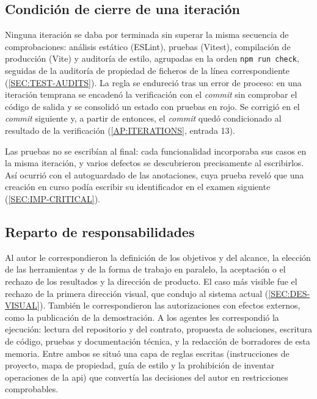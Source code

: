 \subsection{Condición de cierre de una iteración}

Ninguna iteración se daba por terminada sin superar la misma secuencia de comprobaciones:
análisis estático (ESLint), pruebas (Vitest), compilación de producción (Vite) y auditoría de
estilo, agrupadas en la orden \texttt{npm run check}, seguidas de la auditoría de propiedad de
ficheros de la línea correspondiente (\cref{SEC:TEST-AUDITS}). La regla se endureció tras un
error de proceso: en una iteración temprana se encadenó la verificación con el
\textit{commit} sin comprobar el código de salida y se consolidó un estado con pruebas en
rojo. Se corrigió en el \textit{commit} siguiente y, a partir de entonces, el \textit{commit}
quedó condicionado al resultado de la verificación (\cref{AP:ITERATIONS}, entrada 13).

Las pruebas no se escribían al final: cada funcionalidad incorporaba sus casos en la misma
iteración, y varios defectos se descubrieron precisamente al escribirlos. Así ocurrió con el
autoguardado de las anotaciones, cuya prueba reveló que una creación en curso podía escribir
su identificador en el examen siguiente (\cref{SEC:IMP-CRITICAL}).

\subsection{Reparto de responsabilidades}

Al autor le correspondieron la definición de los objetivos y del alcance, la elección de las
herramientas y de la forma de trabajo en paralelo, la aceptación o el rechazo de los
resultados y la dirección de producto. El caso más visible fue el rechazo de la primera
dirección visual, que condujo al sistema actual (\cref{SEC:DES-VISUAL}). También le
correspondieron las autorizaciones con efectos externos, como la publicación de la
demostración. A los agentes les correspondió la ejecución: lectura del repositorio y del
contrato, propuesta de soluciones, escritura de código, pruebas y documentación técnica, y
la redacción de borradores de esta memoria. Entre ambos se situó una capa de reglas escritas
(instrucciones de proyecto, mapa de propiedad, guía de estilo y la prohibición de inventar
operaciones de la \acs{api}) que convertía las decisiones del autor en restricciones
comprobables.


